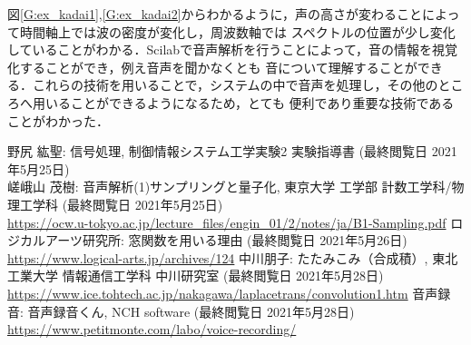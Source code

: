 \documentclass[a4paper,11pt]{jsarticle}
\begin{document}
  図\ref{G:ex_kadai1},\ref{G:ex_kadai2}からわかるように，声の高さが変わることによって時間軸上では波の密度が変化し，周波数軸では
  スペクトルの位置が少し変化していることがわかる．Scilabで音声解析を行うことによって，音の情報を視覚化することができ，例え音声を聞かなくとも
  音について理解することができる．これらの技術を用いることで，システムの中で音声を処理し，その他のところへ用いることができるようになるため，とても
  便利であり重要な技術であることがわかった．

\begin{thebibliography}{99}
   野尻 紘聖: 信号処理, 制御情報システム工学実験2 実験指導書  (最終閲覧日 2021年5月25日)\\
   嵯峨山 茂樹: 音声解析(1)サンプリングと量子化, 東京大学 工学部 計数工学科/物理工学科 (最終閲覧日 2021年5月25日)\\ 
  \url{https://ocw.u-tokyo.ac.jp/lecture_files/engin_01/2/notes/ja/B1-Sampling.pdf}
   ロジカルアーツ研究所: 窓関数を用いる理由 (最終閲覧日 2021年5月26日) \\ \url{https://www.logical-arts.jp/archives/124}
   中川朋子: たたみこみ（合成積）, 東北工業大学 情報通信工学科 中川研究室 (最終閲覧日 2021年5月28日) \\ \url{https://www.ice.tohtech.ac.jp/nakagawa/laplacetrans/convolution1.htm}
   音声録音: 音声録音くん, NCH software (最終閲覧日 2021年5月28日) \\ \url{https://www.petitmonte.com/labo/voice-recording/}
\end{thebibliography}
\end{document}
